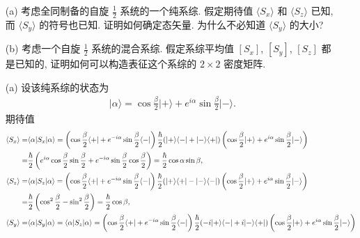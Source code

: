 \documentclass{assignment}
\begin{document}
\begin{prob}[课本习题 3.10]
    \begin{itemize}
        \item[(a)] 考虑全同制备的自旋 $\frac{1}{2}$ 系统的一个纯系综. 假定期待值 $\langle S_x\rangle$ 和 $\langle S_z\rangle$ 已知, 而 $\langle S_y\rangle$ 的符号也已知. 证明如何确定态矢量. 为什么不必知道 $\langle S_y\rangle$ 的大小?
        \item[(b)] 考虑一个自旋 $\frac{1}{2}$ 系统的混合系综. 假定系综平均值 $[S_x]$, $[S_y]$, $[S_z]$ 都是已知的, 证明如何可以构造表征这个系综的 $2\times 2$ 密度矩阵.
    \end{itemize}
\end{prob}
\begin{pf}
    \begin{itemize}
        \item[(a)] 设该纯系综的状态为
        \begin{align}
            \lvert\alpha\rangle=\cos\frac{\beta}{2}\lvert+\rangle+e^{i\alpha}\sin\frac{\beta}{2}\lvert-\rangle.
        \end{align}
        期待值
        \begin{align}
            \notag\langle S_x\rangle=&\langle\alpha\rvert S_x\lvert\alpha\rangle=\left(\cos\frac{\beta}{2}\langle+\rvert+e^{-i\alpha}\sin\frac{\beta}{2}\langle-\rvert\right)\frac{\hbar}{2}(\lvert+\rangle\langle-\rvert+\lvert-\rangle\langle+\rvert)\left(\cos\frac{\beta}{2}\lvert+\rangle+e^{i\alpha}\sin\frac{\beta}{2}\lvert-\rangle\right)\\
            =&\frac{\hbar}{2}\left(e^{i\alpha}\cos\frac{\beta}{2}\sin\frac{\beta}{2}+e^{-i\alpha}\sin\frac{\beta}{2}\cos\frac{\beta}{2}\right)=\frac{\hbar}{2}\cos\alpha\sin\beta,\\
            \notag\langle S_z\rangle=&\langle\alpha\rvert S_z\lvert\alpha\rangle=\left(\cos\frac{\beta}{2}\langle+\rvert+e^{-i\alpha}\sin\frac{\beta}{2}\langle-\rvert\right)\frac{\hbar}{2}(\lvert+\rangle\langle+\rvert-\lvert-\rangle\langle-\rvert)\left(\cos\frac{\beta}{2}\lvert+\rangle+e^{i\alpha}\sin\frac{\beta}{2}\lvert-\rangle\right)\\
            =&\frac{\hbar}{2}\left(\cos^2\frac{\beta}{2}-\sin^2\frac{\beta}{2}\right)=\frac{\hbar}{2}\cos\beta,\\
            \notag\langle S_y\rangle=&\langle\alpha\rvert S_y\lvert\alpha\rangle=\langle\alpha\rvert S_z\lvert\alpha\rangle=\left(\cos\frac{\beta}{2}\langle+\rvert+e^{-i\alpha}\sin\frac{\beta}{2}\langle-\rvert\right)\frac{\hbar}{2}(-i\lvert+\rangle\langle-\rvert+i\lvert-\rangle\langle+\rvert)\left(\cos\frac{\beta}{2}\lvert+\rangle+e^{i\alpha}\sin\frac{\beta}{2}\lvert-\rangle\right)\\

\end{align}
\end{itemize}
\end{pf}
\end{document}
